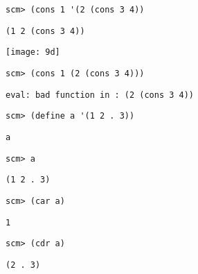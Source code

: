 \documentclass{exam}
\begin{document}
\begin{questions}
\begin{blocksection}
\begin{lstlisting}
scm> (cons 1 '(2 (cons 3 4))
\end{lstlisting}
\begin{solution}[0.25in]
\texttt{(1 2 (cons 3 4))}
\begin{center}
\texttt{[image: 9d]}
\end{center}
\end{solution}

\begin{lstlisting}
scm> (cons 1 (2 (cons 3 4)))
\end{lstlisting}
\begin{solution}[.25in]
\begin{lstlisting}
eval: bad function in : (2 (cons 3 4))
\end{lstlisting}
\end{solution}
\end{blocksection}

\begin{blocksection}
\begin{lstlisting}
scm> (define a '(1 2 . 3))
\end{lstlisting}
\begin{solution}[.25in]
\begin{lstlisting}
a
\end{lstlisting}
\end{solution}

\begin{lstlisting}
scm> a
\end{lstlisting}
\begin{solution}[.25in]
\begin{lstlisting}
(1 2 . 3)
\end{lstlisting}
\end{solution}

\begin{lstlisting}
scm> (car a)
\end{lstlisting}
\begin{solution}[.25in]
\begin{lstlisting}
1
\end{lstlisting}
\end{solution}

\begin{lstlisting}
scm> (cdr a)
\end{lstlisting}
\begin{solution}[.25in]
\begin{lstlisting}
(2 . 3)
\end{lstlisting}
\end{solution}


\end{blocksection}
\end{questions}
\end{document}
